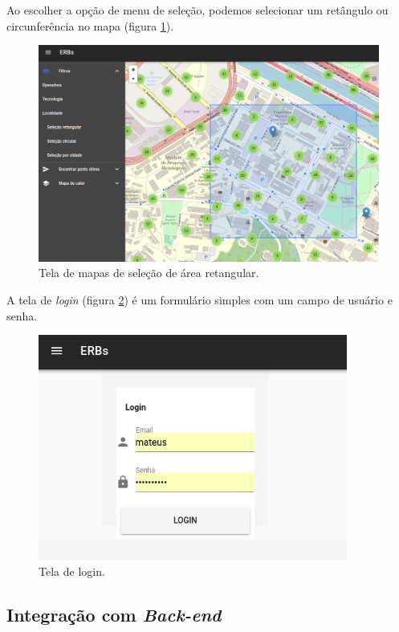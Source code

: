 \documentclass[]{politex}
\begin{document}
Ao escolher a opção de menu de seleção, podemos selecionar um retângulo ou
circunferência no mapa (figura \ref{fig:tela_mapas_retangulo}).

\begin{figure}[H]
    \centering
    \includegraphics[width=6in]{imagens/tela-mapas-retangulo}
    \caption{Tela de mapas de seleção de área retangular.}
    \label{fig:tela_mapas_retangulo}
\end{figure}

A tela de \textit{login} (figura \ref{fig:tela_login}) é um formulário simples
com um campo de usuário e senha.

\begin{figure}[H]
    \centering
    \includegraphics[width=4in]{imagens/tela-login}
    \caption{Tela de login.}
    \label{fig:tela_login}
\end{figure}
\subsection{Integração com \textit{Back-end}}
\end{document}
